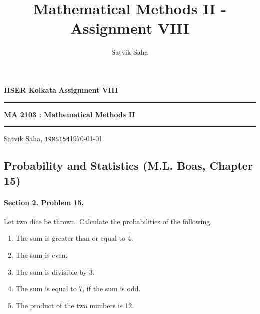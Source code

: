 \documentclass[10pt]{article}
\title{Mathematical Methods II - Assignment VIII}
\author{Satvik Saha}
\date{}
\begin{document}
        \par\textbf{IISER Kolkata} \hfill \textbf{Assignment VIII}
        \vspace{3pt}
        \hrule
        \vspace{3pt}
        \begin{center}
                \LARGE{\textbf{MA 2103 : Mathematical Methods II}}
        \end{center}
        \vspace{3pt}
        \hrule
        \vspace{3pt}
        Satvik Saha, \texttt{19MS154}\hfill\today
        \vspace{20pt}
        \subsection*{Probability and Statistics (M.L. Boas, Chapter 15)}

        \paragraph{Section 2. Problem 15.} Let two dice be thrown. Calculate the probabilities of the following.
        \begin{enumerate}
                \item The sum is greater than or equal to 4.
                \item The sum is even.
                \item The sum is divisible by 3.
                \item The sum is equal to 7, if the sum is odd.
                \item The product of the two numbers is 12.
        \end{enumerate}
\end{document}
